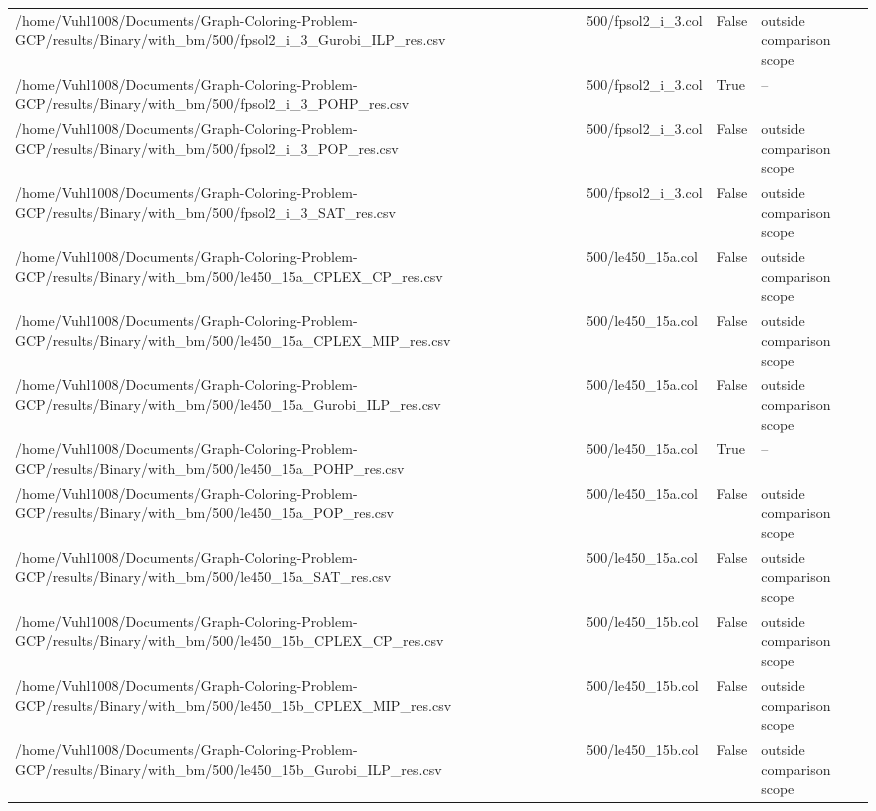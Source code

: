 \begin{table}[htbp]
\begin{tabular}{llll}
/home/Vuhl1008/Documents/Graph-Coloring-Problem-GCP/results/Binary/with\_bm/500/fpsol2\_i\_3\_Gurobi\_ILP\_res.csv & 500/fpsol2\_i\_3.col & False & outside comparison scope \\
/home/Vuhl1008/Documents/Graph-Coloring-Problem-GCP/results/Binary/with\_bm/500/fpsol2\_i\_3\_POHP\_res.csv & 500/fpsol2\_i\_3.col & True & -- \\
/home/Vuhl1008/Documents/Graph-Coloring-Problem-GCP/results/Binary/with\_bm/500/fpsol2\_i\_3\_POP\_res.csv & 500/fpsol2\_i\_3.col & False & outside comparison scope \\
/home/Vuhl1008/Documents/Graph-Coloring-Problem-GCP/results/Binary/with\_bm/500/fpsol2\_i\_3\_SAT\_res.csv & 500/fpsol2\_i\_3.col & False & outside comparison scope \\
/home/Vuhl1008/Documents/Graph-Coloring-Problem-GCP/results/Binary/with\_bm/500/le450\_15a\_CPLEX\_CP\_res.csv & 500/le450\_15a.col & False & outside comparison scope \\
/home/Vuhl1008/Documents/Graph-Coloring-Problem-GCP/results/Binary/with\_bm/500/le450\_15a\_CPLEX\_MIP\_res.csv & 500/le450\_15a.col & False & outside comparison scope \\
/home/Vuhl1008/Documents/Graph-Coloring-Problem-GCP/results/Binary/with\_bm/500/le450\_15a\_Gurobi\_ILP\_res.csv & 500/le450\_15a.col & False & outside comparison scope \\
/home/Vuhl1008/Documents/Graph-Coloring-Problem-GCP/results/Binary/with\_bm/500/le450\_15a\_POHP\_res.csv & 500/le450\_15a.col & True & -- \\
/home/Vuhl1008/Documents/Graph-Coloring-Problem-GCP/results/Binary/with\_bm/500/le450\_15a\_POP\_res.csv & 500/le450\_15a.col & False & outside comparison scope \\
/home/Vuhl1008/Documents/Graph-Coloring-Problem-GCP/results/Binary/with\_bm/500/le450\_15a\_SAT\_res.csv & 500/le450\_15a.col & False & outside comparison scope \\
/home/Vuhl1008/Documents/Graph-Coloring-Problem-GCP/results/Binary/with\_bm/500/le450\_15b\_CPLEX\_CP\_res.csv & 500/le450\_15b.col & False & outside comparison scope \\
/home/Vuhl1008/Documents/Graph-Coloring-Problem-GCP/results/Binary/with\_bm/500/le450\_15b\_CPLEX\_MIP\_res.csv & 500/le450\_15b.col & False & outside comparison scope \\
/home/Vuhl1008/Documents/Graph-Coloring-Problem-GCP/results/Binary/with\_bm/500/le450\_15b\_Gurobi\_ILP\_res.csv & 500/le450\_15b.col & False & outside comparison scope \\

\end{tabular}
\end{table}
